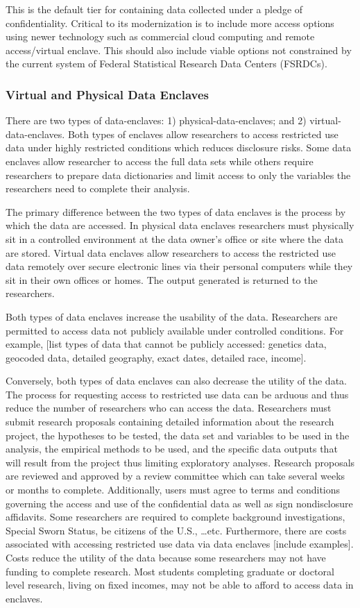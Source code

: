 This is the default tier for containing data collected under a pledge of confidentiality. Critical to its modernization is to include more access options using newer technology such as commercial cloud computing and remote access/virtual enclave. This should also include viable options not constrained by the current system of Federal Statistical Research Data Centers (FSRDCs).

\subsubsection{Virtual and Physical Data Enclaves }
There are two types of \glspl{data-enclave}: 1) \glspl{physical-data-enclave}; and 2) \glspl{virtual-data-enclave}. Both types of enclaves allow researchers to access restricted use data under highly restricted conditions which reduces disclosure risks. Some data enclaves allow researcher to access the full data sets while others require researchers to prepare data dictionaries and limit access to only the variables the researchers need to complete their analysis. 

The primary difference between the two types of data enclaves is the process by which the data are accessed. In physical data enclaves researchers must physically sit in a controlled environment at the data owner’s office or site where the data are stored. Virtual data enclaves allow researchers to access the restricted use data remotely over secure electronic lines via their personal computers while they sit in their own offices or homes. The output generated is returned to the researchers.

Both types of data enclaves increase the usability of the data. Researchers are permitted to access data not publicly available under controlled conditions. For example, [list types of data that cannot be publicly accessed: genetics data, geocoded data, detailed geography, exact dates, detailed race, income]. 

Conversely, both types of data enclaves can also decrease the utility of the data. The process for requesting access to restricted use data can be arduous and thus reduce the number of researchers who can access the data. Researchers must submit research proposals containing detailed information about the research project, the hypotheses to be tested, the data set and variables to be used in the analysis,
the empirical methods to be used, and the specific data outputs that will result from the project thus limiting exploratory analyses. Research proposals are reviewed and approved by a review committee which can take several weeks or months to complete. Additionally, users must agree to terms and conditions governing the access and use of the confidential data as well as sign nondisclosure affidavits. Some researchers are required to complete background investigations, Special Sworn Status, be citizens of the U.S.,  …etc.  Furthermore, there are costs associated with accessing restricted use data via data enclaves [include examples]. Costs reduce the utility of the data because some researchers may not have funding to complete research. Most students completing graduate or doctoral level research, living on fixed incomes, may not be able to afford to access data in enclaves. 

